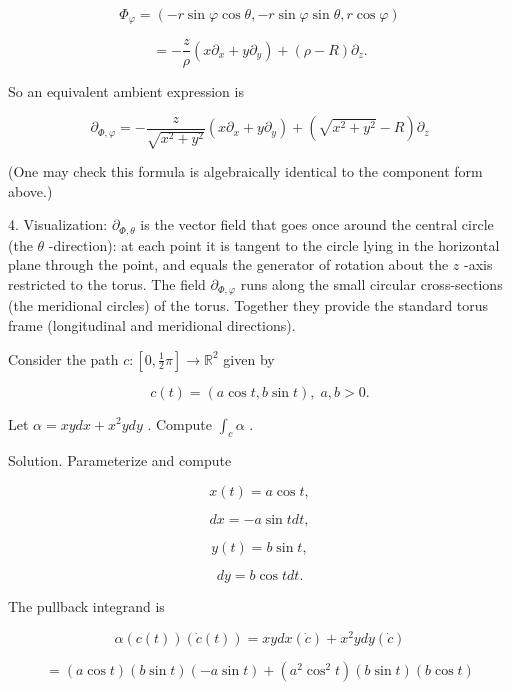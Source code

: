 \documentclass[10pt]{article}
\begin{document}
\[
{\Phi }_{\varphi } = \left( {-r\sin \varphi \cos \theta , - r\sin \varphi \sin \theta ,r\cos \varphi }\right)
\]

\[
=  - \frac{z}{\rho }\left( {x{\partial }_{x} + y{\partial }_{y}}\right)  + \left( {\rho  - R}\right) {\partial }_{z}.
\]

So an equivalent ambient expression is

\[
{\partial }_{\Phi ,\varphi } =  - \frac{z}{\sqrt{{x}^{2} + {y}^{2}}}\left( {x{\partial }_{x} + y{\partial }_{y}}\right)  + \left( {\sqrt{{x}^{2} + {y}^{2}} - R}\right) {\partial }_{z}
\]

(One may check this formula is algebraically identical to the component form above.)

4. Visualization: \({\partial }_{\Phi ,\theta }\) is the vector field that goes once around the central circle (the \(\theta\) -direction): at each point it is tangent to the circle lying in the horizontal plane through the point, and equals the generator of rotation about the \(z\) -axis restricted to the torus. The field \({\partial }_{\Phi ,\varphi }\) runs along the small circular cross-sections (the meridional circles) of the torus. Together they provide the standard torus frame (longitudinal and meridional directions).

\begin{problem}[title=PROBLEM 3 (4 POINTS)]
Consider the path \(c : \left\lbrack  {0,\frac{1}{2}\pi }\right\rbrack   \rightarrow  {\mathbb{R}}^{2}\) given by

\[
c\left( t\right)  = \left( {a\cos t,b\sin t}\right) ,\;a,b > 0.
\]

Let \(\alpha  = {xydx} + {x}^{2}{ydy}\) . Compute \({\int }_{c}\alpha\) .
\end{problem}

Solution. Parameterize and compute

\[
x\left( t\right)  = a\cos t,
\]

\[
{dx} =  - a\sin {tdt},
\]

\[
y\left( t\right)  = b\sin t,
\]

\[
{dy} = b\cos {tdt}.
\]

The pullback integrand is

\[
\alpha \left( {c\left( t\right) }\right) \left( {\dot{c}\left( t\right) }\right)  = {xydx}\left( \dot{c}\right)  + {x}^{2}{ydy}\left( \dot{c}\right)
\]

\[
= \left( {a\cos t}\right) \left( {b\sin t}\right) \left( {-a\sin t}\right)  + \left( {{a}^{2}{\cos }^{2}t}\right) \left( {b\sin t}\right) \left( {b\cos t}\right)
\]
\end{document}
